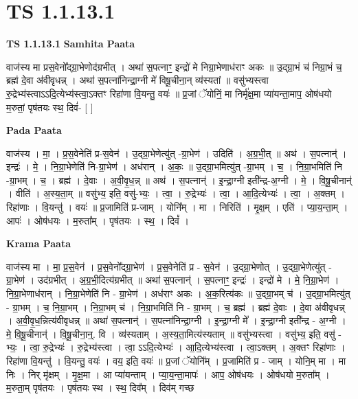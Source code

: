 \documentclass[17pt]{extarticle}
\begin{document}
\section*{ TS 1.1.13.1 }

\textbf{TS 1.1.13.1 } \newline
\textbf{Samhita Paata} \newline

वाज॑स्य मा प्रस॒वेनो᳚द्ग्रा॒भेणोद॑ग्रभीत् । अथा॑ स॒पत्नाꣳ॒॒ इन्द्रो॑ मे निग्रा॒भेणाध॑राꣳ अकः ॥ उ॒द्ग्रा॒भं च॑ निग्रा॒भं च॒ ब्रह्म॑ दे॒वा अ॑वीवृधन्न् । अथा॑ स॒पत्ना॑निन्द्रा॒ग्नी मे॑ विषू॒चीना॒न् व्य॑स्यतां ॥ वसु॑भ्यस्त्वा रु॒द्रेभ्य॑स्त्वाऽऽदि॒त्येभ्य॑स्त्वा॒ऽक्तꣳ रिहा॑णा वि॒यन्तु॒ वयः॑ ॥ प्र॒जां ॅयोनिं॒ मा निर्मृ॑क्ष॒मा प्या॑यन्ता॒माप॒ ओष॑धयो म॒रुतां॒ पृष॑तयः स्थ॒ दिवं॑- [ ] \newline

\textbf{Pada Paata} \newline

वाज॑स्य । मा॒ । प्र॒स॒वेनेति॑ प्र-स॒वेन॑ । उ॒द्ग्रा॒भेणेत्यु॑त् -ग्रा॒भेण॑ । उदिति॑ । अ॒ग्र॒भी॒त् ॥ अथ॑ । स॒पत्नान्॑ । इन्द्रः॑ । मे॒ । नि॒ग्रा॒भेणेति॑ नि-ग्रा॒भेण॑ । अध॑रान् । अ॒कः॒ ॥ उ॒द्ग्रा॒भमित्यु॑त् -ग्रा॒भम् । च॒ । नि॒ग्रा॒भमिति॑ नि -ग्रा॒भम् । च॒ । ब्रह्म॑ । दे॒वाः । अ॒वी॒वृ॒ध॒न्न् ॥ अथ॑ । स॒पत्नान्॑ । इ॒न्द्रा॒ग्नी इती᳚न्द्र-अ॒ग्नी । मे॒ । वि॒षू॒चीनान्॑ । वीति॑ । अ॒स्य॒ता॒म् ॥ वसु॑भ्य॒ इति॒ वसु॑-भ्यः॒ । त्वा॒ । रु॒द्रेभ्यः॑ । त्वा॒ । आ॒दि॒त्येभ्यः॑ । त्वा॒ । अ॒क्तम् । रिहा॑णाः । वि॒यन्तु॑ । वयः॑ ॥ प्र॒जामिति॑ प्र-जाम् । योनि᳚म् । मा । निरिति॑ । मृ॒क्ष॒म् । एति॑ । प्या॒य॒न्ता॒म् । आपः॑ । ओष॑धयः । म॒रुता᳚म् । पृष॑तयः । स्थ॒ । दिवं᳚ ।  \newline


\textbf{Krama Paata} \newline

वाज॑स्य मा । मा॒ प्र॒स॒वेन॑ । प्र॒स॒वेनो᳚द्ग्रा॒भेण॑ । प्र॒स॒वेनेति॑ प्र - स॒वेन॑ । उ॒द्ग्रा॒भेणोत् । उ॒द्ग्रा॒भेणेत्यु॑त् - ग्रा॒भेण॑ । उद॑ग्रभीत् । अ॒ग्र॒भी॒दित्य॑ग्रभीत् ॥ अथा॑ स॒पत्नान्॑ । स॒पत्नाꣳ॒॒ इन्द्रः॑ । इन्द्रो॑ मे । मे॒ नि॒ग्रा॒भेण॑ । नि॒ग्रा॒भेणाध॑रान् । नि॒ग्रा॒भेणेति॑ नि - ग्रा॒भेण॑ । अध॑राꣳ अकः । अ॒क॒रित्य॑कः ॥ उ॒द्ग्रा॒भम् च॑ । उ॒द्ग्रा॒भमित्यु॑त् - ग्रा॒भम् । च॒ नि॒ग्रा॒भम् । नि॒ग्रा॒भम् च॑ । नि॒ग्रा॒भमिति॑ नि - ग्रा॒भम् । च॒ ब्रह्म॑ । ब्रह्म॑ दे॒वाः । दे॒वा अ॑वीवृधन्न् । अ॒वी॒वृ॒ध॒न्नित्य॑वीवृधन्न् ॥ अथा॑ स॒पत्नान्॑ । स॒पत्ना॑निन्द्रा॒ग्नी । इ॒न्द्रा॒ग्नी मे᳚ । इ॒न्द्रा॒ग्नी इती᳚न्द्र - अ॒ग्नी । मे॒ वि॒षू॒चीनान्॑ । वि॒षू॒चीना॒न्॒. वि । व्य॑स्यताम् । अ॒स्य॒ता॒मित्य॑स्यताम् ॥ वसु॑भ्यस्त्वा । वसु॑भ्य॒ इति॒ वसु॑ - भ्यः॒ । त्वा॒ रु॒द्रेभ्यः॑ । रु॒द्रेभ्य॑स्त्वा । त्वा॒ ऽऽदि॒त्येभ्यः॑ । आ॒दि॒त्येभ्य॑स्त्वा । त्वा॒ऽक्तम् । अ॒क्तꣳ रिहा॑णाः । रिहा॑णा वि॒यन्तु॑ । वि॒यन्तु॒ वयः॑ । वय॒ इति॒ वयः॑ ॥ प्र॒जां ॅयोनि᳚म् । प्र॒जामिति॑ प्र - जाम् । योनि॒म् मा । मा निः । निर् मृ॑क्षम् । मृ॒क्ष॒मा । आ प्या॑यन्ताम् । प्या॒य॒न्ता॒मापः॑ । आप॒ ओष॑धयः । ओष॑धयो म॒रुता᳚म् । म॒रुता॒म् पृष॑तयः । पृष॑तयः स्थ । स्थ॒ दिव᳚म् । दिव॑म् गच्छ \newline
\end{document}
